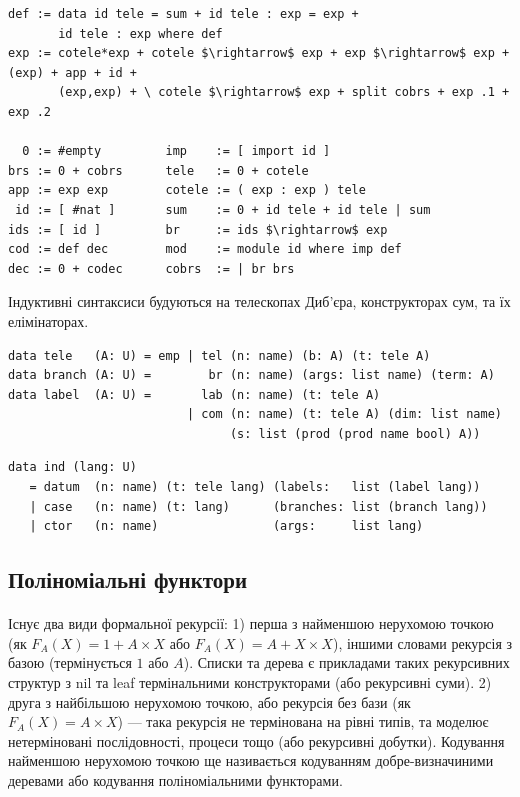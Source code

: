 \begin{lstlisting}[mathescape=true]
def := data id tele = sum + id tele : exp = exp +
       id tele : exp where def
exp := cotele*exp + cotele $\rightarrow$ exp + exp $\rightarrow$ exp + (exp) + app + id +
       (exp,exp) + \ cotele $\rightarrow$ exp + split cobrs + exp .1 + exp .2

  0 := #empty         imp    := [ import id ]
brs := 0 + cobrs      tele   := 0 + cotele
app := exp exp        cotele := ( exp : exp ) tele
 id := [ #nat ]       sum    := 0 + id tele + id tele | sum
ids := [ id ]         br     := ids $\rightarrow$ exp
cod := def dec        mod    := module id where imp def
dec := 0 + codec      cobrs  := | br brs
\end{lstlisting}

Індуктивні синтаксиси будуються на телескопах Диб'єра,
конструкторах сум, та їх елімінаторах.

\begin{lstlisting}
data tele   (A: U) = emp | tel (n: name) (b: A) (t: tele A)
data branch (A: U) =        br (n: name) (args: list name) (term: A)
data label  (A: U) =       lab (n: name) (t: tele A)
                         | com (n: name) (t: tele A) (dim: list name)
                               (s: list (prod (prod name bool) A))
\end{lstlisting}

\begin{lstlisting}
data ind (lang: U)
   = datum  (n: name) (t: tele lang) (labels:   list (label lang))
   | case   (n: name) (t: lang)      (branches: list (branch lang))
   | ctor   (n: name)                (args:     list lang)
\end{lstlisting}

\newpage
\subsection{Поліноміальні функтори}

\paragraph{}
Існує два види формальної рекурсії: 1) перша з найменшою нерухомою точкою
(як $F_A(X) = 1 + A \times X$ або $F_A(X) = A + X \times X$), іншими словами
рекурсія з базою (термінується $1$ або $A$). Списки та дерева є
прикладами таких рекурсивних структур з nil та leaf термінальними
конструкторами (або рекурсивні суми).
2) друга з найбільшою нерухомою точкою, або рекурсія без бази
(як $F_A(X) = A \times X$) --- така рекурсія не термінована на рівні типів,
та моделює нетерміновані послідовності, процеси тощо (або рекурсивні добутки).
Кодування найменшою нерухомою точкою ще називається кодуванням
добре-визначиними деревами або кодування поліноміальними функторами.


